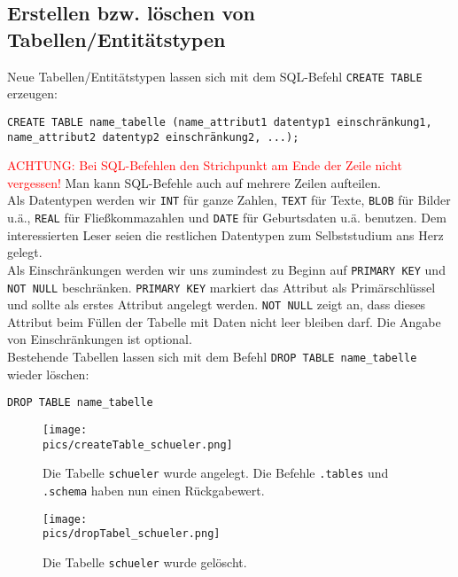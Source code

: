 \subsection{Erstellen bzw. löschen von Tabellen/Entitätstypen}
Neue Tabellen/Entitätstypen lassen sich mit dem SQL-Befehl \lstinline!CREATE TABLE! erzeugen:\\
\begin{tcolorbox}[title=Tabellen erstellen]
	\lstinline[breaklines=true]!CREATE TABLE name_tabelle (name_attribut1 datentyp1 einschränkung1, name_attribut2 datentyp2 einschränkung2, ...);!
\end{tcolorbox}
\textcolor{red}{ACHTUNG: Bei SQL-Befehlen den Strichpunkt am Ende der Zeile nicht vergessen!} Man kann SQL-Befehle auch auf mehrere Zeilen aufteilen.\\
Als Datentypen werden wir \lstinline!INT! für ganze Zahlen, \lstinline!TEXT! für Texte, \lstinline!BLOB! für Bilder u.ä., \lstinline!REAL! für Fließkommazahlen und \lstinline!DATE! für Geburtsdaten u.ä. benutzen. Dem interessierten Leser seien die restlichen Datentypen zum Selbststudium ans Herz gelegt.\\
Als Einschränkungen werden wir uns zumindest zu Beginn auf \lstinline!PRIMARY KEY! und \lstinline!NOT NULL! beschränken. \lstinline!PRIMARY KEY! markiert das Attribut als Primärschlüssel und sollte als erstes Attribut angelegt werden. \lstinline!NOT NULL! zeigt an, dass dieses Attribut beim Füllen der Tabelle mit Daten nicht leer bleiben darf. Die Angabe von Einschränkungen ist optional.\\
Bestehende Tabellen lassen sich mit dem Befehl \lstinline!DROP TABLE name_tabelle! wieder löschen:
\begin{tcolorbox}[title=Tabellen löschen]
	\lstinline[breaklines=true]!DROP TABLE name_tabelle !
\end{tcolorbox}
\begin{figure}[h]
	\centering
	\texttt{[image: \\pics/createTable\_schueler.png]}
	\caption*{Die Tabelle \lstinline!schueler! wurde angelegt. Die Befehle \lstinline!.tables! und \lstinline!.schema! haben nun einen Rückgabewert.}
\end{figure}
\begin{figure}[h]
	\centering
	\texttt{[image: \\pics/dropTabel\_schueler.png]}
	\caption*{Die Tabelle \lstinline!schueler! wurde gelöscht.}
\end{figure}

